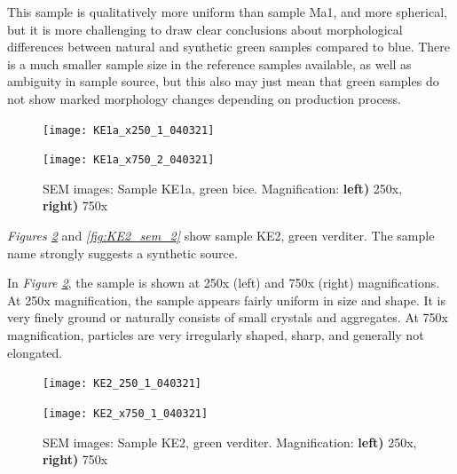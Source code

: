 This sample is qualitatively more uniform than sample Ma1, and more spherical, but it is more challenging to draw clear conclusions about morphological differences between natural and synthetic green samples compared to blue. There is a much smaller sample size in the reference samples available, as well as ambiguity in sample source, but this also may just mean that green samples do not show marked morphology changes depending on production process.

\begin{figure}[H]
\centering
\begin{minipage}{.45\textwidth}
  \centering
  \texttt{[image: KE1a\_x250\_1\_040321]}
\end{minipage}
\begin{minipage}{.45\textwidth}
  \centering
  \texttt{[image: KE1a\_x750\_2\_040321]}
\end{minipage}
\caption[SEM images: Sample KE1a, green bice]{SEM images: Sample KE1a, green bice. Magnification: \textbf{left)} 250x, \textbf{right)} 750x}
\label{fig:KE1a_sem_1}
\end{figure}




\textit{Figures \ref{fig:KE2_sem_1}} and \textit{\ref{fig:KE2_sem_2}} show sample KE2, green verditer. The sample name strongly suggests a synthetic source. 

In \textit{Figure \ref{fig:KE2_sem_1}}, the sample is shown at 250x (left) and 750x (right) magnifications. At 250x magnification, the sample appears fairly uniform in size and shape. It is very finely ground or naturally consists of small crystals and aggregates. At 750x magnification, particles are very irregularly shaped, sharp, and generally not elongated.

\begin{figure}[H]
\centering
\begin{minipage}{.45\textwidth}
  \centering
  \texttt{[image: KE2\_250\_1\_040321]}
\end{minipage}
\begin{minipage}{.45\textwidth}
  \centering
  \texttt{[image: KE2\_x750\_1\_040321]}
\end{minipage}
\caption[SEM images: Sample KE2, green verditer]{SEM images: Sample KE2, green verditer. Magnification: \textbf{left)} 250x, \textbf{right)} 750x}
\label{fig:KE2_sem_1}
\end{figure}

